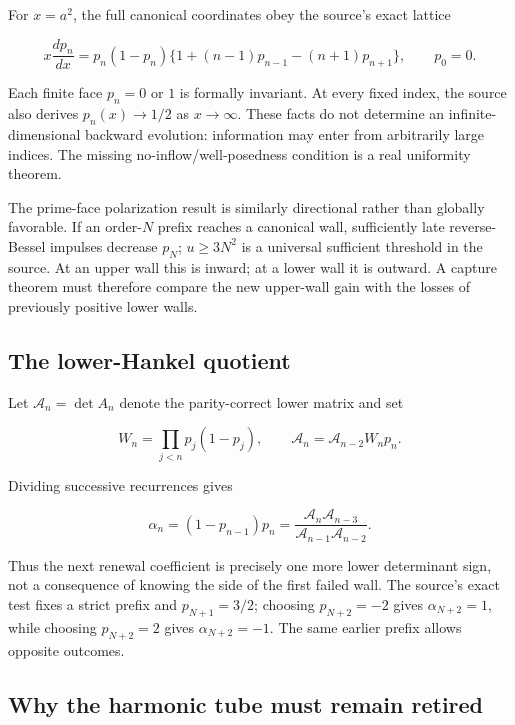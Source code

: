 \documentclass[
  10pt,
  a4paper,
  10pt,
  oneside,
  openany]{book}
\begin{document}
For \(x=a^2\), the full canonical coordinates obey the source's exact
lattice

\[
 x\frac{dp_n}{dx}
 =p_n(1-p_n)\{1+(n-1)p_{n-1}-(n+1)p_{n+1}\},
 \qquad p_0=0.
 \tag{35.1}\label{eq:35.1}
\]

Each finite face \(p_n=0\) or \(1\) is formally invariant. At every
fixed index, the source also derives \(p_n(x)\to1/2\) as \(x\to\infty\).
These facts do not determine an infinite-dimensional backward evolution:
information may enter from arbitrarily large indices. The missing
no-inflow/well-posedness condition is a real uniformity theorem.

The prime-face polarization result is similarly directional rather than
globally favorable. If an order-\(N\) prefix reaches a canonical wall,
sufficiently late reverse-Bessel impulses decrease \(p_N\); \(u\ge3N^2\)
is a universal sufficient threshold in the source. At an upper wall this
is inward; at a lower wall it is outward. A capture theorem must
therefore compare the new upper-wall gain with the losses of previously
positive lower walls.

\subsection{The lower-Hankel quotient}\label{the-lower-hankel-quotient}

Let \(\mathcal A_n=\det A_n\) denote the parity-correct lower matrix and
set

\[
 W_n=\prod_{j<n}p_j(1-p_j),\qquad
 \mathcal A_n=\mathcal A_{n-2}W_np_n.
\]

Dividing successive recurrences gives

\[
 \boxed{\alpha_n=(1-p_{n-1})p_n
 =\frac{\mathcal A_n\mathcal A_{n-3}}
 {\mathcal A_{n-1}\mathcal A_{n-2}}.}
 \tag{35.2}\label{eq:35.2}
\]

Thus the next renewal coefficient is precisely one more lower
determinant sign, not a consequence of knowing the side of the first
failed wall. The source's exact test fixes a strict prefix and
\(p_{N+1}=3/2\); choosing \(p_{N+2}=-2\) gives \(\alpha_{N+2}=1\), while
choosing \(p_{N+2}=2\) gives \(\alpha_{N+2}=-1\). The same earlier
prefix allows opposite outcomes.

\subsection{Why the harmonic tube must remain
retired}\label{why-the-harmonic-tube-must-remain-retired}
\end{document}
